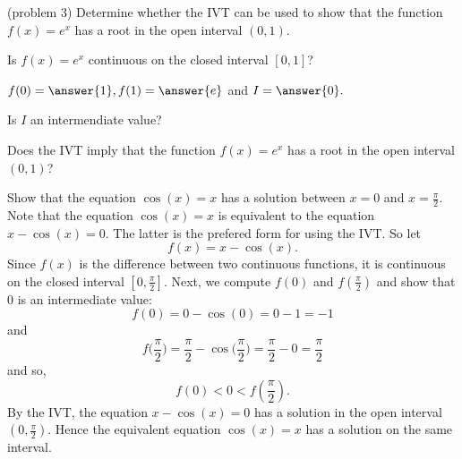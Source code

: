 \documentclass{ximera}
\begin{document}
\begin{problem}(problem 3)
Determine whether the IVT can be used to show that the function $f(x) = e^x$ has a root in the open interval $(0,1)$.

Is $f(x) = e^x$ continuous on the closed interval $[0,1]$? 
\begin{center}
\begin{multipleChoice}
\end{multipleChoice}
\end{center}

$f(0) = \answer{1}, f(1) = \answer{e}$ and $I = \answer{0}.$

Is $I$ an intermendiate value? 
\begin{multipleChoice}
\end{multipleChoice}

Does the IVT imply that the function $f(x) = e^x$ has a root in the open interval $(0, 1)$?
\begin{multipleChoice}
\end{multipleChoice}
\end{problem}




\begin{example}[example 4]
 Show that the equation $\cos(x) = x$ has a solution 
between $x = 0$ and $x = \frac{\pi}{2}$. \\
Note that the equation $\cos(x) = x$ is equivalent to the equation $x - \cos(x) =0$.
The latter is the prefered form for using the IVT.
So let 
\[f(x) = x - \cos(x).\] 
 Since $f(x)$ is the difference between two continuous functions,
it is continuous on the closed interval $[0, \frac{\pi}{2}]$. 
Next, we compute $f(0)$ and $f(\frac{\pi}{2})$ and show that 0 is an intermediate value:
\[f(0) = 0 - \cos(0) = 0-1 = -1 \]
and
\[f\big(\frac{\pi}{2}\big) = \frac{\pi}{2} - \cos\big(\frac{\pi}{2}\big) = \frac{\pi}{2}-0 = \frac{\pi}{2} \]
and so,
\[f(0) < 0 < f(\frac{\pi}{2}).\]
By the IVT, the equation $ x - \cos(x) =0$ has a solution in the open 
interval $(0, \frac{\pi}{2})$. Hence the equivalent equation $\cos(x) = x$ 
has a solution on the same interval.
\end{example}
\end{document}

